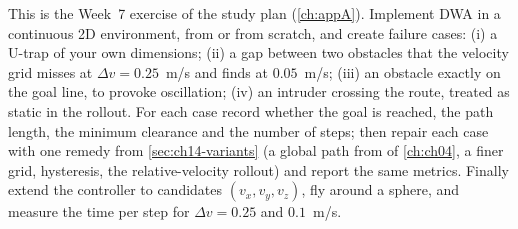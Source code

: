 \begin{exercise}
\label{exr:ch14-coding}
This is the Week~7 exercise of the study plan (\cref{ch:appA}). Implement
DWA in a continuous 2D environment, from  or from scratch,
and create failure cases: (i) a U-trap of your own dimensions; (ii) a gap
between two obstacles that the velocity grid misses at $\Delta v = 0.25$~m/s
and finds at $0.05$~m/s; (iii) an obstacle exactly on the goal line, to
provoke oscillation; (iv) an intruder crossing the route, treated as static
in the rollout. For each case record whether the goal is reached, the path
length, the minimum clearance and the number of steps; then repair each case
with one remedy from \cref{sec:ch14-variants} (a global path from \astar of
\cref{ch:ch04}, a finer grid, hysteresis, the relative-velocity rollout) and
report the same metrics. Finally extend the controller to candidates
$(v_x, v_y, v_z)$, fly around a sphere, and measure the time per step for
$\Delta v = 0.25$ and $0.1$~m/s.
\end{exercise}
